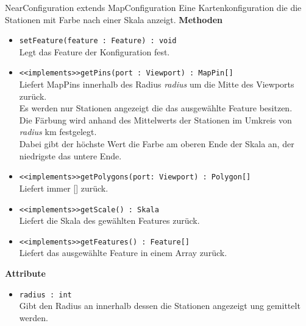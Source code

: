     \begin{Class}{NearConfiguration extends MapConfiguration}
        Eine Kartenkonfiguration die die Stationen mit Farbe nach einer Skala anzeigt.
        \textbf{Methoden}
        \begin{itemize}
            \item \texttt{setFeature(feature : Feature) : void}
            \\ Legt das Feature der Konfiguration fest.
            \item \texttt{<<implements>>getPins(port : Viewport) : MapPin[]}
            \\ Liefert MapPins innerhalb des Radius \emph{radius} um die Mitte des Viewports zurück.
            \\ Es werden nur Stationen angezeigt die das ausgewählte Feature besitzen.
            \\ Die Färbung wird anhand des Mittelwerts der Stationen im Umkreis von \emph{radius} km festgelegt.
            \\ Dabei gibt der höchste Wert die Farbe am oberen Ende der Skala an, der niedrigste das untere Ende.
            \item \texttt{<<implements>>getPolygons(port: Viewport) : Polygon[]}
            \\ Liefert immer [] zurück.
            \item \texttt{<<implements>>getScale() : Skala}
            \\ Liefert die Skala des gewählten Features zurück.
            \item \texttt{<<implements>>getFeatures() : Feature[]}
            \\ Liefert das ausgewählte Feature in einem Array zurück.
        \end{itemize}
        \textbf{Attribute}
        \begin{itemize}
            \item \texttt{radius : int}
            \\ Gibt den Radius an innerhalb dessen die Stationen angezeigt ung gemittelt werden.
        \end{itemize}
    \end{Class}

